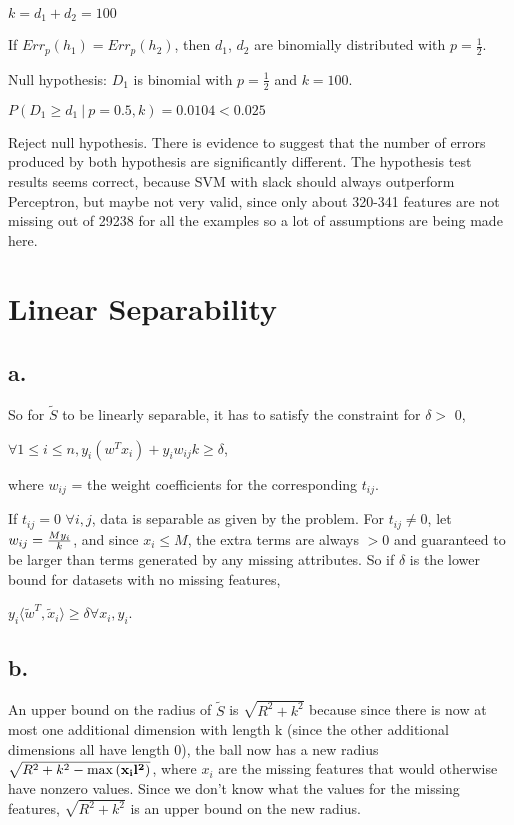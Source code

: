 \documentclass[]{article}
\begin{document}
$k = d_1 + d_2 = 100$

If $Err_p(h_1) = Err_p(h_2)$, then $d_1$, $d_2$ are binomially distributed with $p = \frac{1}{2}$.

Null hypothesis: $D_1$ is binomial with $p=\frac{1}{2}$ and $k=100$.

$P(D_1 \ge d_1~|~p = 0.5, k) = 0.0104 < 0.025$

Reject null hypothesis. There is evidence to suggest that the number of errors produced by both hypothesis are significantly different. The hypothesis test results seems correct, because SVM with slack should always outperform Perceptron, but maybe not very valid, since only about 320-341 features are not missing out of 29238 for all the examples so a lot of assumptions are being made here.


\section{Linear Separability}
\subsection{a.}
So for $\tilde S$ to be linearly separable, it has to satisfy the constraint for $\delta >$ 0, 

$\forall 1\leq i\leq n, y_i\left(w^T x_i\right) + y_i w_{ij} k \geq \delta$, 

where $w_{ij}$ = the weight coefficients for the corresponding $t_{ij}$. 

If $t_{ij} = 0$ $\forall i,j$, data is separable as given by the problem.
For $t_{ij} \neq 0$, let $w_{ij} = \large\frac{{M y_i}}{k}$, and since $x_i \le M$, the extra terms are always $> 0$ and guaranteed to be larger than terms generated by any missing attributes. So if $\delta$ is the lower bound for datasets with no missing features,

$y_i\langle{\tilde w^T}, {\tilde x_i}\rangle \ge \delta \forall x_i,y_i$.

\subsection{b.}
An upper bound on the radius of $\tilde S$ is $\sqrt{R^{2} + k^{2}}$ because since there is now at most one additional dimension with length k (since the other additional dimensions all have length 0), the ball now has a new radius
$\sqrt{R^{2} + k^{2} - \max \left( \bf x_i l^2 \right)}$, where $x_{i}$ are the missing features that would otherwise have nonzero values. Since we don't know what the values for the missing features, $\sqrt{R^{2} + k^{2}}$ is an upper bound on the new radius.
\end{document}
